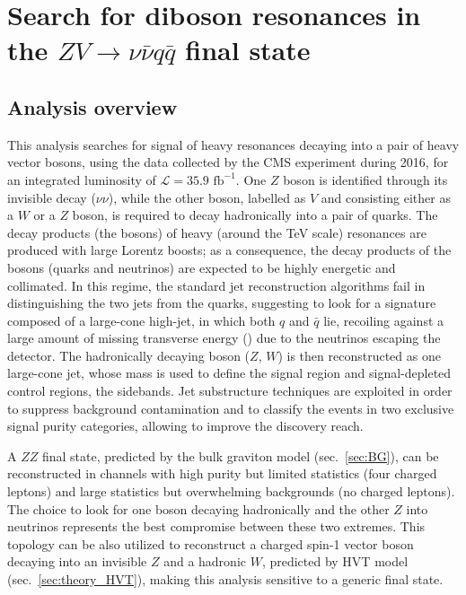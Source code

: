 \chapter{Search for diboson resonances in the $ZV \rightarrow \nu \bar{\nu} q \bar{q}$ final state}
\section{Analysis overview}

This analysis searches for signal of heavy resonances decaying into a pair of heavy vector bosons, using the data collected by the CMS experiment during 2016, for an integrated luminosity of $\mathcal{L}=35.9 \mbox{ fb}^{-1}$. One $Z$ boson is identified through its invisible decay ($\nu \nu$), while the other boson, labelled as $V$ and consisting either as a $W$ or a $Z$ boson, is required to decay hadronically into a pair of quarks. %
The decay products (the bosons) of heavy (around the TeV scale) resonances are produced with large Lorentz boosts; as a consequence, the decay products of the bosons (quarks and neutrinos) are expected to be highly energetic and collimated. In this regime, the standard jet reconstruction algorithms fail in distinguishing the two jets from the quarks, suggesting to look for a signature composed of a large-cone high-\pt jet, in which both $q$ and $\bar{q}$ lie, recoiling against a large amount of missing transverse energy (\met) due to the neutrinos escaping the detector. The hadronically decaying boson ($Z$, $W$) is then reconstructed as one large-cone jet, whose mass is used to define the signal region and signal-depleted control regions, the sidebands. Jet substructure techniques are exploited in order to suppress background contamination and to classify the events in two exclusive signal purity categories, allowing to improve the discovery reach.

\noindent A $ZZ$ final state, predicted by the bulk graviton model (sec.~\ref{sec:BG}), can be reconstructed in channels with high purity but limited statistics (four charged leptons) and large statistics but overwhelming backgrounds (no charged leptons). The choice to look for one boson decaying hadronically and the other $Z$ into neutrinos represents the best compromise between these two extremes. This topology can be also utilized to reconstruct a charged spin-1 vector boson decaying into an invisible $Z$ and a hadronic $W$, predicted by HVT model (sec.~\ref{sec:theory_HVT}), making this analysis sensitive to a generic \VZ final state.

